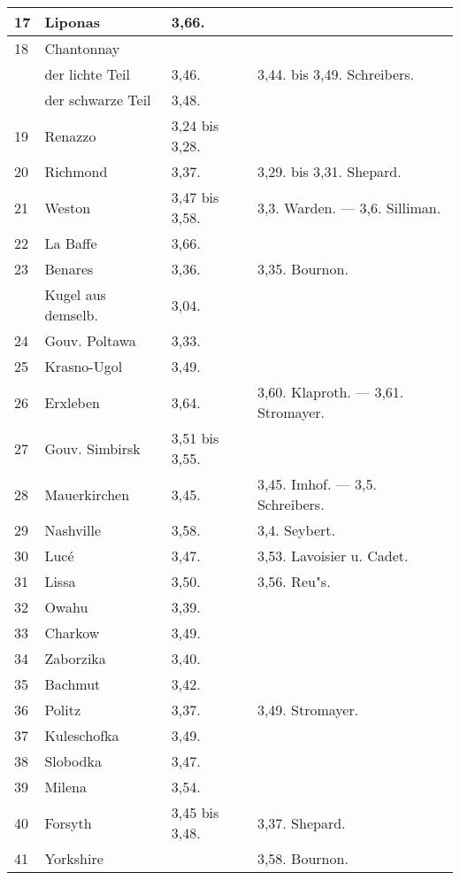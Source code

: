 \documentclass[a4paper, 11pt, oneside, polutonikogreek, german]{article}
\begin{document}
\begin{center}
\begin{longtable}{|p{7mm}|p{32mm}|p{30mm}|p{30mm}|}
        17 & Liponas & 3,66. &   \\ \hline
        18 & Chantonnay &   &   \\ \hline
          & der lichte Teil & 3,46. & 3,44. bis 3,49. Schreibers. \\ \hline
          & der schwarze Teil & 3,48. &   \\ \hline
        19 & Renazzo & 3,24 bis 3,28. &   \\ \hline
        20 & Richmond & 3,37. & 3,29. bis 3,31. Shepard. \\ \hline
        21 & Weston & 3,47 bis 3,58. & 3,3. Warden. --- 3,6. Silliman. \\ \hline
        22 & La Baffe & 3,66. &   \\ \hline
        23 & Benares & 3,36. & 3,35. Bournon. \\ \hline
          & Kugel aus demselb. & 3,04. &   \\ \hline
        24 & Gouv. Poltawa & 3,33. &   \\ \hline
        25 & Krasno-Ugol & 3,49. &   \\ \hline
        26 & Erxleben & 3,64. & 3,60. Klaproth. --- 3,61. Stromayer. \\ \hline
        27 & Gouv. Simbirsk & 3,51 bis 3,55. &   \\ \hline
        28 & Mauerkirchen & 3,45. & 3,45. Imhof. --- 3,5. Schreibers. \\ \hline
        29 & Nashville & 3,58. & 3,4. Seybert. \\ \hline
        30 & Lucé & 3,47. & 3,53. Lavoisier u. Cadet. \\ \hline
        31 & Lissa & 3,50. & 3,56. Reu"s. \\ \hline
        32 & Owahu & 3,39. &   \\ \hline
        33 & Charkow & 3,49. &   \\ \hline
        34 & Zaborzika & 3,40. &   \\ \hline
        35 & Bachmut & 3,42. &   \\ \hline
        36 & Politz & 3,37. & 3,49. Stromayer. \\ \hline
        37 & Kuleschofka & 3,49. &   \\ \hline
        38 & Slobodka & 3,47. &   \\ \hline
        39 & Milena & 3,54. &   \\ \hline
        40 & Forsyth & 3,45 bis 3,48. & 3,37. Shepard. \\ \hline
        41 & Yorkshire &   & 3,58. Bournon. \\ \hline

\end{longtable}
\end{center}
\end{document}
